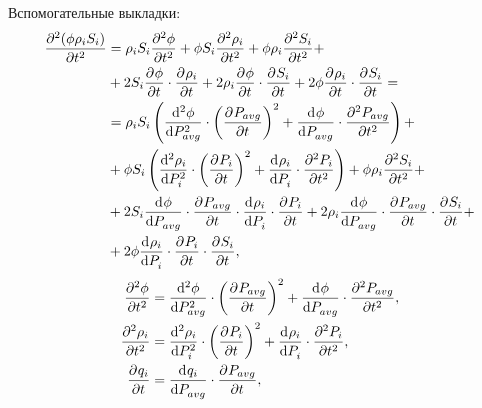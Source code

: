 Вспомогательные выкладки:
\begin{equation} \label{eq:calcs1}
 \begin{aligned}
  \pd[2]{(\phi \rho_i S_i)}{t} &= \rho_i S_i \pd[2]{\phi}{t} + \phi S_i \pd[2]{\rho_i}{t} + \phi \rho_i \pd[2]{S_i}{t} + \\
  &+ 2S_i \pd{\phi}{t} \cdot \pd{\rho_i}{t} + 2\rho_i \pd{\phi}{t} \cdot \pd{S_i}{t} + 2\phi \pd{\rho_i}{t} \cdot \pd{S_i}{t} = \\
  &= \rho_i S_i \left(  \dd[2]{\phi}{P_{avg}} \cdot {\left( \pd{P_{avg}}{t}\right) }^2 + \dd{\phi}{P_{avg}} \cdot \pd[2]{P_{avg}}{t} \right) +\\
  &+ \phi S_i \left( \dd[2]{\rho_i}{P_i} \cdot {\left( \pd{P_i}{t}\right) }^2 + \dd{\rho_i}{P_i} \cdot \pd[2]{P_i}{t} \right) + \phi \rho_i \pd[2]{S_i}{t} +\\
  &+ 2S_i \dd{\phi}{P_{avg}} \cdot \pd{P_{avg}}{t} \cdot \dd{\rho_i}{P_i} \cdot \pd{P_i}{t} + 2\rho_i \dd{\phi}{P_{avg}} \cdot \pd{P_{avg}}{t} \cdot \pd{S_i}{t} +\\
  &+ 2\phi \dd{\rho_i}{P_i} \cdot \pd{P_i}{t} \cdot \pd{S_i}{t},
 \end{aligned}
\end{equation}
\begin{equation} \label{eq:calcs2}
 \begin{aligned}
  \pd[2]{\phi}{t} &= \dd[2]{\phi}{P_{avg}} \cdot {\left( \pd{P_{avg}}{t}\right) }^2 + \dd{\phi}{P_{avg}} \cdot \pd[2]{P_{avg}}{t}, \\
  \pd[2]{\rho_i}{t} &= \dd[2]{\rho_i}{P_i} \cdot {\left( \pd{P_i}{t}\right) }^2 + \dd{\rho_i}{P_i} \cdot \pd[2]{P_i}{t}, \\
  \pd{q_i}{t} &= \dd{q_i}{P_{avg}} \cdot \pd{P_{avg}}{t},
 \end{aligned}
\end{equation}

